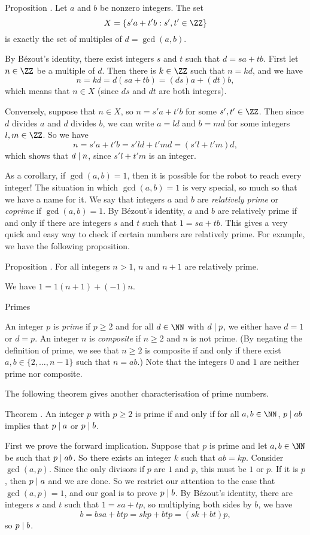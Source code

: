 \edef\propfrogs{\the\thmcount}
\proclaim Proposition \advthm. Let $a$ and $b$ be nonzero integers. The set
$$X = \{ s'a + t'b : s',t'\in \ZZ\}$$
is exactly the set of multiples of $d = \gcd(a,b)$.

\proof By B\'ezout's identity, there exist integers $s$ and $t$ such that $d = sa+tb$.
First let $n\in \ZZ$ be a multiple of $d$. Then there is $k\in \ZZ$ such that $n=kd$,
and we have
$$ n = kd = d(sa+tb) = (ds)a + (dt)b,$$
which means that $n\in X$ (since $ds$ and $dt$ are both integers).

Conversely, suppose that $n\in X$, so $n = s'a + t'b$ for some $s',t'\in \ZZ$. Then since
$d$ divides $a$ and $d$ divides $b$, we can write $a = ld$ and $b=md$ for some integers $l,m\in \ZZ$.
So we have
$$ n= s'a + t'b = s'ld + t'md = (s'l+t'm)d,$$
which shows that $d\mid n$, since $s'l+t'm$ is an integer.\slug

As a corollary, if $\gcd(a,b) = 1$, then it is possible for the robot to reach every integer!
The situation in which $\gcd(a,b) = 1$ is very special, so much so that we have a name for it.
We say that integers $a$ and $b$ are {\it relatively prime} or {\it coprime} if $\gcd(a,b) = 1$.
By B\'ezout's identity, $a$ and $b$ are relatively prime if and only if
there are integers $s$ and $t$ such that $1 = sa + tb$. This gives a very quick and easy way to
check if certain numbers are relatively prime. For example, we have the following proposition.

\proclaim Proposition \advthm. For all integers $n>1$, $n$ and $n+1$ are relatively prime.

\proof We have $1= 1(n+1) + (-1)n$.\slug

\advsect Primes

An integer $p$ is {\it prime} if $p\ge 2$ and for all $d\in \NN$ with $d\mid p$,
we either have $d=1$ or $d = p$. An integer $n$ is {\it composite}
if $n\ge 2$ and $n$ is not prime. (By negating the definition of prime, we
see that $n\ge 2$ is composite if and only if there exist $a,b\in \{2,\ldots,n-1\}$ such that
$n = ab$.) Note that the integers $0$ and $1$ are neither prime nor composite.

The following theorem gives another characterisation of prime numbers.

\edef\thmpdivides{\the\thmcount}
\proclaim Theorem \advthm. An integer $p$ with $p\ge 2$ is prime if and only if
for all $a,b\in \NN$, $p\mid ab$ implies that $p\mid a$ or $p\mid b$.

\proof First we prove the forward implication.
Suppose that $p$ is prime and let $a,b\in \NN$ be such that $p\mid ab$. So
there exists an integer $k$ such that $ab = kp$.
Consider $\gcd(a,p)$. Since the
only divisors if $p$ are $1$ and $p$, this must be $1$ or $p$. If it is $p$,
then $p\mid a$ and we are done. So we restrict our attention to the case that
$\gcd(a,p) =1$, and our goal is to prove $p\mid b$. By B\'ezout's identity,
there are integers $s$ and $t$ such that $1= sa+tp$, so multiplying both sides by $b$,
we have
$$ b =bsa+btp = skp + btp = (sk+bt)p,$$
so $p\mid b$.

